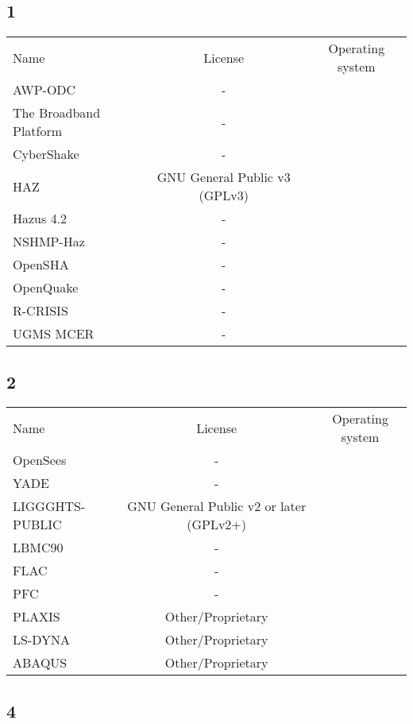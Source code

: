 
\subsection{1}

\begin{table}[]
    \centering
    \begin{tabular}{l|cc}
    \toprule
    Name &  License & Operating system\\ 
        AWP-ODC & - &\\
        The Broadband Platform & - &\\
        CyberShake & - &\\
        HAZ &  GNU General Public  v3 (GPLv3) &\\
        Hazus 4.2 & - &\\
        NSHMP-Haz & - &\\
        OpenSHA & - &\\
        OpenQuake & - &\\
        R-CRISIS & - &\\
        UGMS MCER & - &\\ 
    \bottomrule
    \end{tabular}
\end{table}

\subsection{2}

\begin{table}[]
    \centering
    \begin{tabular}{l|cc}
    \toprule
    Name &  License & Operating system\\ 
        OpenSees & - &\\
        YADE & - &\\
        LIGGGHTS-PUBLIC &  GNU General Public  v2 or later (GPLv2+) &\\
        LBMC90 & - &\\
        FLAC & - &\\
        PFC & - &\\
        PLAXIS &  Other/Proprietary  &\\
        LS-DYNA &  Other/Proprietary  &\\
        ABAQUS &  Other/Proprietary  &\\ 
    \bottomrule
    \end{tabular}
\end{table}

\subsection{4}

